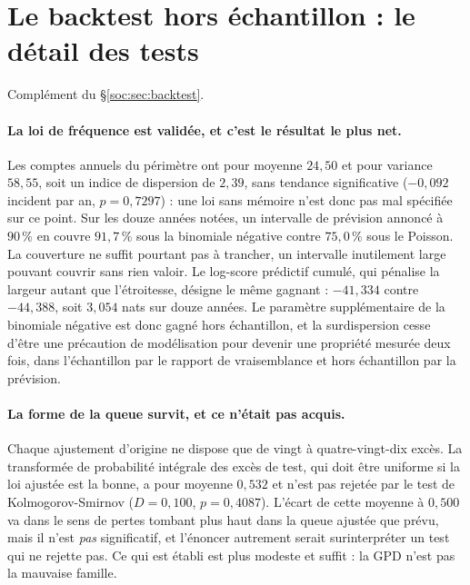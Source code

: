 \section{Le backtest hors échantillon : le détail des tests}
\label{sec:ann-backtest}


Complément du \S\ref{soc:sec:backtest}.

\paragraph{La loi de fréquence est validée, et c'est le résultat le plus net.} Les comptes
annuels du périmètre ont pour moyenne $24{,}50$ et pour variance $58{,}55$, soit un indice de
dispersion de $2{,}39$, sans tendance significative ($-0{,}092$ incident par an, $p=0{,}7297$) :
une loi sans mémoire n'est donc pas mal spécifiée sur ce point. Sur les douze années notées, un
intervalle de prévision annoncé à $90\,\%$ en couvre $91{,}7\,\%$ sous la binomiale négative
contre $75{,}0\,\%$ sous le Poisson. La couverture ne suffit pourtant pas à trancher, un
intervalle inutilement large pouvant couvrir sans rien valoir. Le log-score prédictif
cumulé, qui pénalise la largeur autant que l'étroitesse, désigne le même gagnant :
$-41{,}334$ contre $-44{,}388$, soit $3{,}054$ nats sur douze années. Le paramètre
supplémentaire de la binomiale négative est donc gagné hors échantillon, et la surdispersion
cesse d'être une précaution de modélisation pour devenir une propriété mesurée deux fois, dans
l'échantillon par le rapport de vraisemblance et hors échantillon par la prévision.

\paragraph{La forme de la queue survit, et ce n'était pas acquis.} Chaque ajustement d'origine ne
dispose que de vingt à quatre-vingt-dix excès. La transformée de probabilité intégrale des excès
de test, qui doit être uniforme si la loi ajustée est la bonne, a pour moyenne $0{,}532$ et n'est
pas rejetée par le test de Kolmogorov-Smirnov ($D=0{,}100$, $p=0{,}4087$). L'écart de cette
moyenne à $0{,}500$ va dans le sens de pertes tombant plus haut dans la queue ajustée que prévu,
mais il n'est \emph{pas} significatif, et l'énoncer autrement serait surinterpréter un test qui
ne rejette pas. Ce qui est établi est plus modeste et suffit : la GPD n'est pas la mauvaise
famille.

